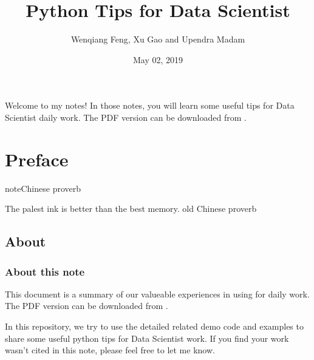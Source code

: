 \documentclass[letterpaper,12pt,english]{sphinxmanual}
\title{Python Tips for Data Scientist}
\date{May 02, 2019}
\author{Wenqiang Feng, Xu Gao and Upendra Madam}
\begin{document}
\pagestyle{empty}
\sphinxmaketitle
\pagestyle{plain}
\sphinxtableofcontents
\pagestyle{normal}
\label{\detokenize{index::doc}}\begin{quote}

\begin{figure}[htbp]
\centering

\noindent{}
\end{figure}
\end{quote}

Welcome to my  notes! In those notes, you will learn some useful tips for Data Scientist daily work. The PDF version can be downloaded from .




\chapter{Preface}
\label{\detokenize{preface:preface}}\label{\detokenize{preface:id1}}\label{\detokenize{preface::doc}}
\begin{sphinxadmonition}{note}{Chinese proverb}

The palest ink is better than the best memory. \textendash{} old Chinese proverb
\end{sphinxadmonition}


\section{About}
\label{\detokenize{preface:about}}

\subsection{About this note}
\label{\detokenize{preface:about-this-note}}
This document is a summary of our valueable experiences in using 
for  daily work. The PDF version can be downloaded from .


In this repository, we try to use the detailed  related demo code and
examples to share some useful python tips for Data Scientist work. If you
find your work wasn’t cited in this note, please feel free to let me know.
\end{document}
